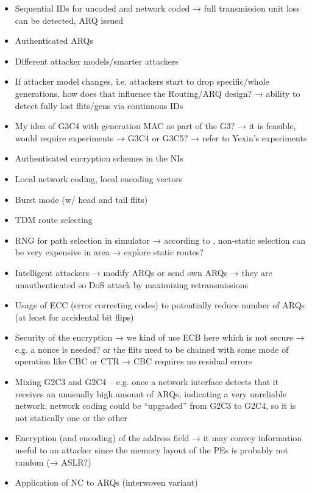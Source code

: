 \begin{itemize}
    \item Sequential IDs for uncoded and network coded → full transmission unit loss can be detected, ARQ issued
    \item Authenticated ARQs
    \item Different attacker models/smarter attackers
    \item If attacker model changes, i.e. attackers start to drop specific/whole generations,
        how does that influence the Routing/ARQ design? → ability to detect fully lost flits/gens via continuous IDs
    \item My idea of G3C4 with generation MAC as part of the G3? → it is feasible, would require experiments → G3C4 or G3C5? → refer to Yexin's
        experiments
    \item Authenticated encryption schemes in the NIs
    \item Local network coding, local encoding vectors
    \item Burst mode (w/ head and tail flits)
    \item TDM route selecting
    \item RNG for path selection in simulator → according to \cite{stefan11enhancingnocs}, non-static selection can be very expensive in area →
        explore static routes?
    \item Intelligent attackers → modify ARQs or send own ARQs → they are unauthenticated so DoS attack by maximizing retransmissions
    \item Usage of ECC (error correcting codes) to potentially reduce number of ARQs (at least for accidental bit flips)
    \item Security of the encryption → we kind of use ECB here which is not secure → e.g. a nonce is needed? or the flits need to be chained with some
        mode of operation like CBC or CTR → CBC requires no residual errors
    \item Mixing G2C3 and G2C4 -- e.g. once a network interface detects that it receives an unusually high amount of ARQs, indicating a very
        unreliable network, network coding could be \enquote{upgraded} from G2C3 to G2C4, so it is not statically one or the other
    \item Encryption (and encoding) of the address field → it may convey information useful to an attacker since the memory layout of the PEs is probably not random
        (→ ASLR?)
    \item Application of NC to ARQs (interwoven variant)
\end{itemize}
